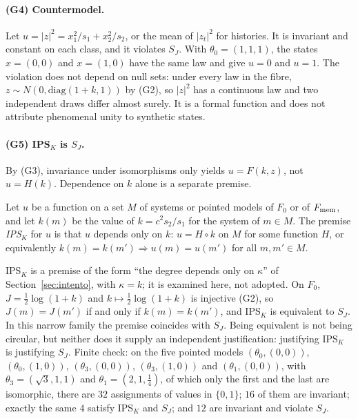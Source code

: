 \paragraph{(G4) Countermodel.} Let $u=|z|^2=x_1^2/s_1+x_2^2/s_2$, or the mean of $|z_t|^2$ for histories. It is invariant and constant on each class, and it violates $S_J$. With $\theta_0=(1,1,1)$, the states $x=(0,0)$ and $x=(1,0)$ have the same law and give $u=0$ and $u=1$. The violation does not depend on null sets: under every law in the fibre, $z\sim N(0,\mathrm{diag}(1+k,1))$ by (G2), so $|z|^2$ has a continuous law and two independent draws differ almost surely. It is a formal function and does not attribute phenomenal unity to synthetic states. \stS

\paragraph{(G5) IPS$_K$ is $S_J$.} By (G3), invariance under isomorphisms only yields $u=F(k,z)$, not $u=H(k)$. Dependence on $k$ alone is a separate premise.
\begin{definition}\label{def:IPS}
Let $u$ be a function on a set $M$ of systems or pointed models of $F_0$ or of $F_{\rm mem}$, and let $k(m)$ be the value of $k=c^2s_2/s_1$ for the system of $m\in M$. The premise \emph{IPS$_K$} for $u$ is that $u$ depends only on $k$: $u=H\circ k$ on $M$ for some function $H$, or equivalently $k(m)=k(m')\Rightarrow u(m)=u(m')$ for all $m,m'\in M$.
\end{definition}
IPS$_K$ is a premise of the form ``the degree depends only on $\kappa$'' of Section~\ref{sec:intento}, with $\kappa=k$; it is examined here, not adopted. On $F_0$, $J=\tfrac12\log(1+k)$ and $k\mapsto\tfrac12\log(1+k)$ is injective (G2), so $J(m)=J(m')$ if and only if $k(m)=k(m')$, and IPS$_K$ is equivalent to $S_J$. In this narrow family the premise coincides with $S_J$. Being equivalent is not being circular, but neither does it supply an independent justification: justifying IPS$_K$ is justifying $S_J$. Finite check: on the five pointed models $(\theta_0,(0,0))$, $(\theta_0,(1,0))$, $(\theta_3,(0,0))$, $(\theta_3,(1,0))$ and $(\theta_1,(0,0))$, with $\theta_3=(\sqrt3,1,1)$ and $\theta_1=(2,1,\tfrac14)$, of which only the first and the last are isomorphic, there are $32$ assignments of values in $\{0,1\}$; $16$ of them are invariant; exactly the same $4$ satisfy IPS$_K$ and $S_J$; and $12$ are invariant and violate $S_J$. \stS


